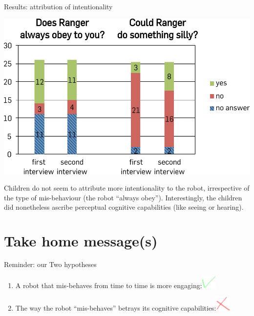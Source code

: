 \documentclass[compress]{beamer}
\renewcommand{\bf}{\Medium}
\begin{document}
\begin{frame}{Results: attribution of intentionality}
    \begin{center}
    \includegraphics[height=0.6\textheight]{domino-intention}
    \end{center}
    Children {\bf do not seem to attribute more intentionality} to the
    robot, irrespective of the type of mis-behaviour (the robot ``always
    obey'').
    Interestingly, the children did nonetheless ascribe perceptual cognitive capabilities
    (like seeing or hearing).
\end{frame}


\section{Take home message(s)}

\begin{frame}{Reminder: our Two hypotheses}
\begin{enumerate}
    \item {\bf A robot that mis-behaves from time to time is more
        engaging:}\hspace{3mm}\includegraphics[width=0.06\textwidth]{ok}
    \item {\bf The way the robot ``mis-behaves'' betrays its cognitive
    capabilities:}\hspace{3mm}\includegraphics[width=0.06\textwidth]{ko}
\end{enumerate}

\end{frame}
\end{document}
